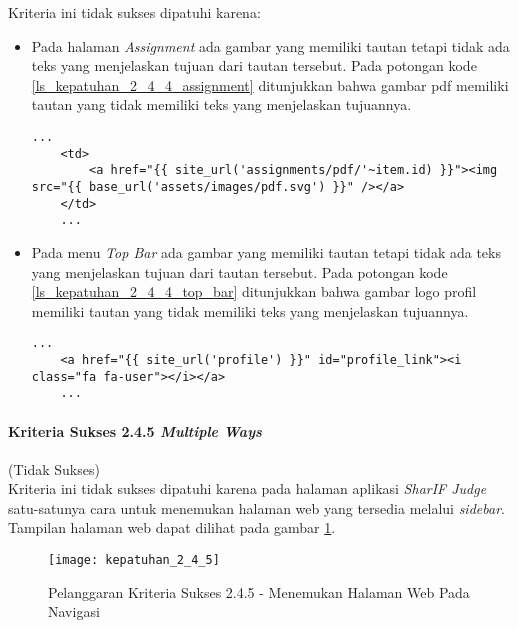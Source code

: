 Kriteria ini tidak sukses dipatuhi karena:
\begin{itemize}
	\item Pada halaman \textit{Assignment} ada gambar yang memiliki tautan tetapi tidak ada teks yang menjelaskan tujuan dari tautan tersebut. Pada potongan kode \ref{ls_kepatuhan_2_4_4_assignment} ditunjukkan bahwa gambar pdf memiliki tautan yang tidak memiliki teks yang menjelaskan tujuannya.
	\begin{lstlisting}[basicstyle=\ttfamily, frame=single,
	columns=fullflexible, keepspaces=true, breaklines=true, label=ls_kepatuhan_2_4_4_assignment, caption=Pelanggaran Kriteria Sukses 2.4.4 - Gambar PDF Tidak Diberi Teks Alternatif]
	...
	<td>
		<a href="{{ site_url('assignments/pdf/'~item.id) }}"><img src="{{ base_url('assets/images/pdf.svg') }}" /></a>
	</td>
	...
	\end{lstlisting}
	
	\item Pada menu \textit{Top Bar} ada gambar yang memiliki tautan tetapi tidak ada teks yang menjelaskan tujuan dari tautan tersebut. Pada potongan kode \ref{ls_kepatuhan_2_4_4_top_bar} ditunjukkan bahwa gambar logo profil memiliki tautan yang tidak memiliki teks yang menjelaskan tujuannya.
	\begin{lstlisting}[basicstyle=\ttfamily, frame=single,
	columns=fullflexible, keepspaces=true, breaklines=true, label=ls_kepatuhan_2_4_4_top_bar, caption=Pelanggaran Kriteria Sukses 2.4.4 - Gambar Logo \textit{Profile} Tidak Diberi Teks Alternatif]
	...
	<a href="{{ site_url('profile') }}" id="profile_link"><i class="fa fa-user"></i></a>
	...
	\end{lstlisting}
	
\end{itemize}

\paragraph{Kriteria Sukses 2.4.5 \textit{Multiple Ways}}
\label{subsubsec:kepatuhan_kriteria_2.4.5}
(Tidak Sukses) \\

Kriteria ini tidak sukses dipatuhi karena pada halaman aplikasi \textit{SharIF Judge} satu-satunya cara untuk menemukan halaman web yang tersedia melalui \textit{sidebar}. Tampilan halaman web dapat dilihat pada gambar \ref{fig:kepatuhan_2_4_5}.
\begin{figure}[H]
	\centering  
	\texttt{[image: kepatuhan\_2\_4\_5]}  
	\caption[Pelanggaran Kriteria Sukses 2.4.5 - Menemukan Halaman Web Pada Navigasi]{Pelanggaran Kriteria Sukses 2.4.5 - Menemukan Halaman Web Pada Navigasi} 
	\label{fig:kepatuhan_2_4_5} 
\end{figure}

